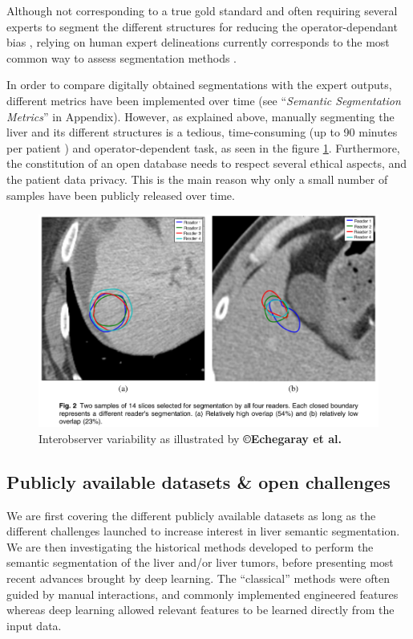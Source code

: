 \documentclass[]{article}
\begin{document}
	Although not corresponding to a true gold standard \cite{Heimann2009} and often requiring several experts to segment the
	different structures for reducing the operator-dependant bias \cite{Echegaray2015, Moltz2009}, relying on human expert
	delineations currently corresponds to the most common way to assess
	segmentation methods \cite{Bilic2019}.
	
	In order to compare digitally obtained segmentations with the expert
	outputs, different metrics have been implemented over time (see
	``\emph{Semantic Segmentation Metrics}'' in Appendix). However, as
	explained above, manually segmenting the liver and its different
	structures is a tedious, time-consuming (up to 90 minutes per patient
	\cite{Gotra2017}) and operator-dependent task, as seen in the figure \ref{interobserver_var}.
	Furthermore, the constitution of an open database needs to respect
	several ethical aspects, and the patient data privacy. This is the main
	reason why only a small number of samples have been publicly released
	over time.
	
	\begin{figure}[!h]
		\centering        
		\includegraphics[width=0.7\linewidth]{./images/image37.png}
		\caption{Interobserver variability as illustrated by \textbf{©Echegaray et al.} \cite{Echegaray2015}}
		\label{interobserver_var}
	\end{figure} 
	
	\subsection*{Publicly available datasets \& open challenges}
	
	We are first covering the different publicly available datasets as long
	as the different challenges launched to increase interest in liver
	semantic segmentation. We are then investigating the historical methods
	developed to perform the semantic segmentation of the liver and/or liver
	tumors, before presenting most recent advances brought by deep learning.
	The ``classical'' methods were often guided by manual interactions,
	and commonly implemented engineered features whereas deep learning
	allowed relevant features to be learned directly from the input data.
	
\end{document}

